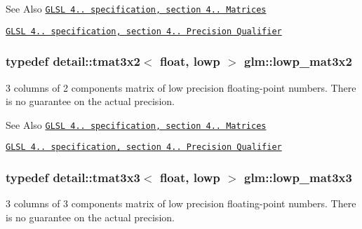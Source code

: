 \begin{DoxySeeAlso}{See Also}
\href{http://www.opengl.org/registry/doc/GLSLangSpec.4.20.8.pdf}{\tt G\-L\-S\-L 4.. specification, section 4.. Matrices} 

\href{http://www.opengl.org/registry/doc/GLSLangSpec.4.20.8.pdf}{\tt G\-L\-S\-L 4.. specification, section 4.. Precision Qualifier} 
\end{DoxySeeAlso}
\hypertarget{group__core__precision_ga17219f89f804dbf4620d4caacf32cfe2}{
\subsubsection[{lowp\-\_\-mat3x2}]{\setlength{\rightskip}{0pt plus 5cm}typedef detail\-::tmat3x2$<$ float, lowp $>$ {\bf glm\-::lowp\-\_\-mat3x2}}}\label{group__core__precision_ga17219f89f804dbf4620d4caacf32cfe2}
3 columns of 2 components matrix of low precision floating-\/point numbers. There is no guarantee on the actual precision.

\begin{DoxySeeAlso}{See Also}
\href{http://www.opengl.org/registry/doc/GLSLangSpec.4.20.8.pdf}{\tt G\-L\-S\-L 4.. specification, section 4.. Matrices} 

\href{http://www.opengl.org/registry/doc/GLSLangSpec.4.20.8.pdf}{\tt G\-L\-S\-L 4.. specification, section 4.. Precision Qualifier} 
\end{DoxySeeAlso}
\hypertarget{group__core__precision_ga31688b397d10806ead332c3adb7dc0f0}{
\subsubsection[{lowp\-\_\-mat3x3}]{\setlength{\rightskip}{0pt plus 5cm}typedef detail\-::tmat3x3$<$ float, lowp $>$ {\bf glm\-::lowp\-\_\-mat3x3}}}\label{group__core__precision_ga31688b397d10806ead332c3adb7dc0f0}
3 columns of 3 components matrix of low precision floating-\/point numbers. There is no guarantee on the actual precision.

